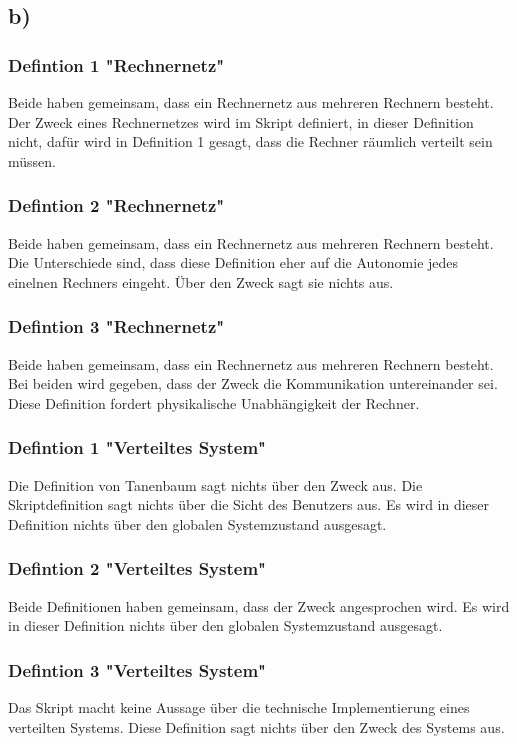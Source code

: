 \documentclass[a4paper,12pt]{scrartcl}
\begin{document}
\subsection{b)}
\subsubsection{Defintion 1 "Rechnernetz"}
Beide haben gemeinsam, dass ein Rechnernetz aus mehreren Rechnern besteht.
Der Zweck eines Rechnernetzes wird im Skript definiert, in dieser Definition
nicht, dafür wird in Definition 1 gesagt, dass die Rechner räumlich verteilt
sein müssen.

\subsubsection{Defintion 2 "Rechnernetz"}
Beide haben gemeinsam, dass ein Rechnernetz aus mehreren Rechnern besteht.
Die Unterschiede sind, dass diese Definition eher auf die Autonomie jedes
einelnen Rechners eingeht. Über den Zweck sagt sie nichts aus.

\subsubsection{Defintion 3 "Rechnernetz"}
Beide haben gemeinsam, dass ein Rechnernetz aus mehreren Rechnern besteht.
Bei beiden wird gegeben, dass der Zweck die Kommunikation untereinander sei.
Diese Definition fordert physikalische Unabhängigkeit der Rechner.

\subsubsection{Defintion 1 "Verteiltes System"}
Die Definition von Tanenbaum sagt nichts über den Zweck aus. Die 
Skriptdefinition sagt nichts über die Sicht des Benutzers aus.
Es wird in dieser Definition nichts über den globalen Systemzustand ausgesagt.

\subsubsection{Defintion 2 "Verteiltes System"}
Beide Definitionen haben gemeinsam, dass der Zweck angesprochen wird.
Es wird in dieser Definition nichts über den globalen Systemzustand ausgesagt.

\subsubsection{Defintion 3 "Verteiltes System"}
Das Skript macht keine Aussage über die technische Implementierung eines
verteilten Systems. Diese Definition sagt nichts über den Zweck des Systems aus.
\end{document}
